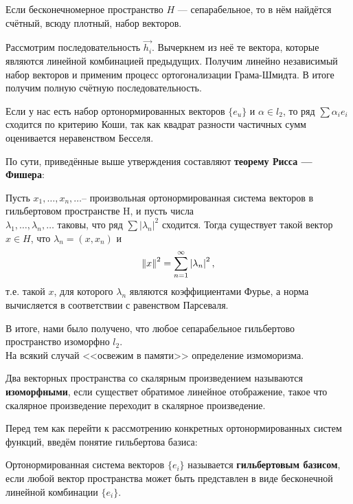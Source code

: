 \documentclass[12pt]{article}
\begin{document}
		Если бесконечномерное пространство $H$ --- сепарабельное, то в нём найдётся счётный, всюду плотный, набор векторов.
	
		Рассмотрим последовательность $\vec{h_i}$. Вычеркнем из неё те вектора, которые являются линейной комбинацией предыдущих.
		Получим линейно независимый набор векторов и применим процесс ортогонализации Грама-Шмидта. В итоге получим полную счётную 
		последовательность.
	
		Если у нас есть набор ортонормированных векторов $\{ e_u \}$ и $\alpha \in l_2$, то ряд $\sum \alpha_i e_i$ сходится по 
		критерию Коши, так как квадрат разности частичных сумм оценивается неравенством Бесселя.
	
		По сути, приведённые выше утверждения составляют \textbf{теорему Рисса --- Фишера}:
		\begin{theorem}
			Пусть $x_1, \dots ,x_n, \dots $-- произвольная ортонормированная система векторов в гильбертовом пространстве H, и пусть 
			числа \\
			$\lambda _1, \dots ,\lambda _n, \dots $ таковы, что ряд $\sum |\lambda_n|^2$ сходится. Тогда существует такой 
			вектор $x\in H$, что $\lambda _n=(x,x_n)$ и
			$$
				\left\| x \right\| ^2=\sum_{n=1}^{\infty } \left| \lambda_n \right|^2,
			$$
			т.е. такой $x$, для которого $\lambda_n$ являются коэффициентами Фурье, а норма вычисляется в 
			соответствии с равенством Парсеваля. 
		\end{theorem}
	
		В итоге, нами было получено, что любое сепарабельное гильбертово пространство изоморфно $l_2$. \\
		На всякий случай <<освежим в памяти>> определение измоморизма.
		\begin{defi}
			Два векторных пространства со скалярным произведением называются 
			\textbf{изоморфными}, если существет обратимое линейное отображение, 
			такое что скалярное произведение переходит в скалярное произведение.
		\end{defi}
	
		Перед тем как перейти к рассмотрению конкретных ортонормированных систем функций, введём понятие гильбертова базиса:
		\begin{defi}
			Ортонормированная система векторов $\{ e_i \}$ называется \textbf{гильбертовым базисом}, если любой вектор
			пространства может быть представлен в виде бесконечной линейной комбинации $ \{ e_i \} $.
		\end{defi}
	
\end{document}
